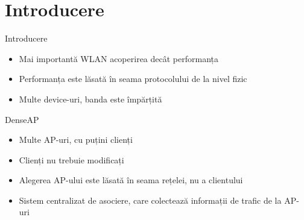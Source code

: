 \section{Introducere}

\begin{frame}{Introducere}
  \begin{itemize}
    \item Mai importantă WLAN acoperirea decât performanța
    \item Performanța este lăsată în seama protocolului de la nivel fizic
    \item Multe device-uri, banda este împărțită
  \end{itemize}
\end{frame}

\begin{frame}{DenseAP}
  \begin{itemize}
    \item Multe AP-uri, cu puțini clienți
    \item Clienți nu trebuie modificați
    \pause
    \item Alegerea AP-ului este lăsată în seama rețelei, nu a clientului
    \item Sistem centralizat de asociere, care colectează informații de trafic de la AP-uri
  \end{itemize}
\end{frame}

